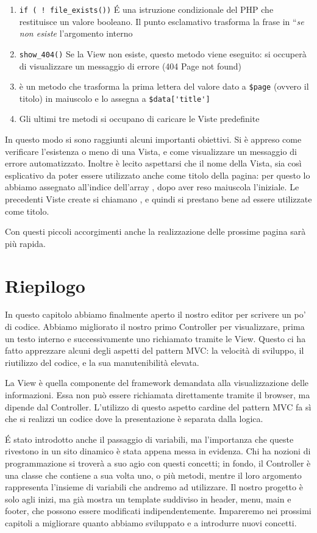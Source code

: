 \begin{enumerate}
\item \verb|if ( ! file_exists())| \'E una istruzione condizionale del \ac{PHP} che restituisce un valore booleano. Il punto esclamativo trasforma la frase in ``\emph{se non esiste} l'argomento interno
\item \verb|show_404()| Se la View non esiste, questo metodo viene eseguito: si occuperà di visualizzare un messaggio di errore (404 Page not found)
\item {} è un metodo che trasforma la prima lettera del valore dato a \verb|$page| (ovvero il titolo) in maiuscolo e lo assegna a \verb|$data['title']|
\item Gli ultimi tre metodi si occupano di caricare le Viste predefinite
\end{enumerate}

In questo modo si sono raggiunti alcuni importanti obiettivi. Si è appreso come verificare l'esistenza o meno di una Vista, e come visualizzare un messaggio di errore automatizzato. Inoltre è lecito aspettarsi che il nome della Vista, sia così esplicativo da poter essere utilizzato anche come titolo della pagina: per questo lo abbiamo assegnato all'indice  dell'array , dopo aver reso maiuscola l'iniziale. Le precedenti Viste create si chiamano ,  e quindi si prestano bene ad essere utilizzate come titolo.

Con questi piccoli accorgimenti anche la realizzazione delle prossime pagina sarà più rapida.

\section*{Riepilogo}
In questo capitolo abbiamo finalmente aperto il nostro editor per scrivere un po' di codice. Abbiamo migliorato il nostro primo Controller per visualizzare, prima un testo interno e successivamente uno richiamato tramite le View. Questo ci ha fatto apprezzare alcuni degli aspetti del pattern \ac{MVC}: la velocità di sviluppo, il riutilizzo del codice, e la sua manutenibilità elevata. 

La View è quella componente del framework demandata alla visualizzazione delle informazioni. Essa non può essere richiamata direttamente tramite il browser, ma dipende dal Controller. L'utilizzo di questo aspetto cardine del pattern \ac{MVC} fa sì che si realizzi un codice dove la presentazione è separata dalla logica.

\'E stato introdotto anche il passaggio di variabili, ma l'importanza che queste rivestono in un sito dinamico è stata appena messa in evidenza. Chi ha nozioni di programmazione si troverà a suo agio con questi concetti; in fondo, il Controller è una classe che contiene a sua volta uno, o più metodi, mentre il loro argomento rappresenta l'insieme di variabili che andremo ad utilizzare. Il nostro progetto è solo agli inizi, ma già mostra un template suddiviso in header, menu, main e footer, che possono essere modificati indipendentemente. Impareremo nei prossimi capitoli a migliorare quanto abbiamo sviluppato e a introdurre nuovi concetti.